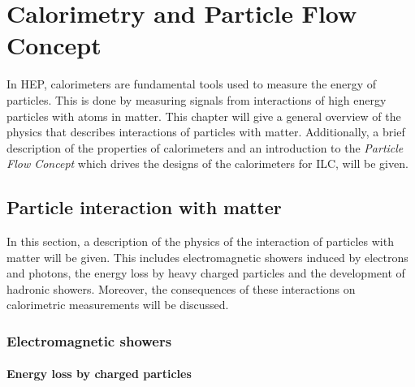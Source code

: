 \chapter{Calorimetry and Particle Flow Concept}

In HEP, calorimeters are fundamental tools used to measure the energy of particles. This is done by measuring signals from interactions of high energy particles with atoms in matter. This chapter will give a general overview of the physics that describes interactions of particles with matter. Additionally, a brief description of the properties of calorimeters and an introduction to the \textit{Particle Flow Concept} which drives the designs of the calorimeters for ILC, will be given.

\section{Particle interaction with matter}
\label{sec:PartInter}

In this section, a description of the physics of the interaction of particles with matter will be given. This includes electromagnetic showers induced by electrons and photons, the energy loss by heavy charged particles and the development of hadronic showers. Moreover, the consequences of these interactions on calorimetric measurements will be discussed.

\subsection{Electromagnetic showers}

\subsubsection{Energy loss by charged particles}

